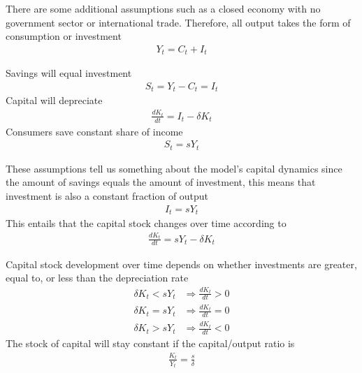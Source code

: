 \documentclass{beamer}
\begin{document}
\begin{frame}
  There are some additional assumptions such as a closed economy with no government sector or international trade.
  Therefore, all output takes the form of consumption or investment 
  \begin{align}
    Y_t =C_t+I_t
  \end{align}
\end{frame}

\begin{frame}
 Savings will equal investment
 \begin{align}
   S_t=Y_t-C_t=I_t
 \end{align}
 \medskip
 Capital will depreciate
 \begin{align}
  \frac{dK_t}{dt}=I_t -\delta K_t
 \end{align}
 \medskip
 Consumers save constant share of income
 \begin{align}
  S_t=sY_t
 \end{align}
\end{frame}


\begin{frame}
  These assumptions tell us something about the model's capital dynamics since the amount of savings equals the amount of investment, this means that investment is also a constant fraction of output
  \begin{align}
    I_t=sY_t
  \end{align}
  This entails that the capital stock changes over time according to
  \begin{align}
    \frac{dK_t}{dt}=sY_t-\delta K_t
  \end{align}
\end{frame}


\begin{frame}
    Capital stock development over time depends on whether investments are greater, equal to, or less than the depreciation rate
 \begin{align}
    \delta K_t < sY_t &\Rightarrow \frac{dK_t}{dt} > 0\\
    \delta K_t = sY_t &\Rightarrow \frac{dK_t}{dt} = 0\\
    \delta K_t > sY_t &\Rightarrow \frac{dK_t}{dt} < 0
 \end{align}
 \medskip
 The stock of capital will stay constant if the capital/output ratio is
  \begin{align}
    \frac{K_t}{Y_t} = \frac{s}{\delta}
  \end{align}
\end{frame}
\end{document}
